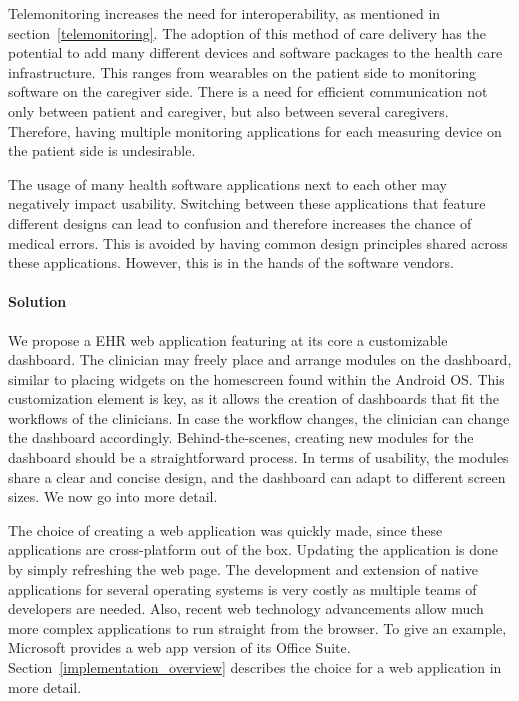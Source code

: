     Telemonitoring increases the need for interoperability, as mentioned in section~\ref{telemonitoring}. The adoption of this method of care delivery has the potential to add many different devices and software packages to the health care infrastructure. This ranges from wearables on the patient side to monitoring software on the caregiver side. There is a need for efficient communication not only between patient and caregiver, but also between several caregivers. Therefore, having multiple monitoring applications for each measuring device on the patient side is undesirable.

    The usage of many health software applications next to each other may negatively impact usability. Switching between these applications that feature different designs can lead to confusion and therefore increases the chance of medical errors. This is avoided by having common design principles shared across these applications. However, this is in the hands of the software vendors.

    \paragraph{Solution} We propose a EHR web application featuring at its core a customizable dashboard. The clinician may freely place and arrange modules on the dashboard, similar to placing widgets on the homescreen found within the Android OS\@. This customization element is key, as it allows the creation of dashboards that fit the workflows of the clinicians. In case the workflow changes, the clinician can change the dashboard accordingly. Behind-the-scenes, creating new modules for the dashboard should be a straightforward process. In terms of usability, the modules share a clear and concise design, and the dashboard can adapt to different screen sizes. We now go into more detail.

    The choice of creating a web application was quickly made, since these applications are cross-platform out of the box. Updating the application is done by simply refreshing the web page. The development and extension of native applications for several operating systems is very costly as multiple teams of developers are needed. Also, recent web technology advancements allow much more complex applications to run straight from the browser. To give an example, Microsoft provides a web app version of its Office Suite. Section~\ref{implementation_overview} describes the choice for a web application in more detail.

